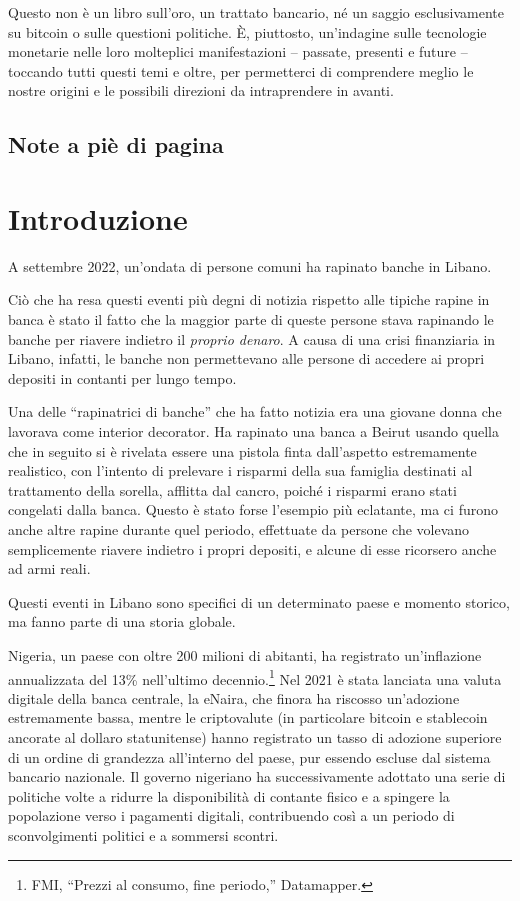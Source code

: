 \documentclass[
  a5paper,
  smalldemyvopaper,10pt,twoside,onecolumn,openright,extrafontsizes,hidelinks]{memoir}
\begin{document}
Questo non è un libro sull'oro, un trattato bancario, né un saggio
esclusivamente su bitcoin o sulle questioni politiche. È, piuttosto,
un'indagine sulle tecnologie monetarie nelle loro molteplici
manifestazioni -- passate, presenti e future -- toccando tutti questi
temi e oltre, per permetterci di comprendere meglio le nostre origini e
le possibili direzioni da intraprendere in avanti.

\section{Note a piè di pagina}\label{note-a-piuxe8-di-pagina}


\chapter{Introduzione}\label{introduzione-1}

A settembre 2022, un'ondata di persone comuni ha rapinato banche in
Libano.

Ciò che ha resa questi eventi più degni di notizia rispetto alle tipiche
rapine in banca è stato il fatto che la maggior parte di queste persone
stava rapinando le banche per riavere indietro il \emph{proprio denaro}.
A causa di una crisi finanziaria in Libano, infatti, le banche non
permettevano alle persone di accedere ai propri depositi in contanti per
lungo tempo.

Una delle ``rapinatrici di banche'' che ha fatto notizia era una giovane
donna che lavorava come interior decorator. Ha rapinato una banca a
Beirut usando quella che in seguito si è rivelata essere una pistola
finta dall'aspetto estremamente realistico, con l'intento di prelevare i
risparmi della sua famiglia destinati al trattamento della sorella,
afflitta dal cancro, poiché i risparmi erano stati congelati dalla
banca. Questo è stato forse l'esempio più eclatante, ma ci furono anche
altre rapine durante quel periodo, effettuate da persone che volevano
semplicemente riavere indietro i propri depositi, e alcune di esse
ricorsero anche ad armi reali.

Questi eventi in Libano sono specifici di un determinato paese e momento
storico, ma fanno parte di una storia globale.

Nigeria, un paese con oltre 200 milioni di abitanti, ha registrato
un'inflazione annualizzata del 13\% nell'ultimo decennio.\footnote{FMI,
  ``Prezzi al consumo, fine periodo,'' Datamapper.} Nel 2021 è stata
lanciata una valuta digitale della banca centrale, la eNaira, che finora
ha riscosso un'adozione estremamente bassa, mentre le criptovalute (in
particolare bitcoin e stablecoin ancorate al dollaro statunitense) hanno
registrato un tasso di adozione superiore di un ordine di grandezza
all'interno del paese, pur essendo escluse dal sistema bancario
nazionale. Il governo nigeriano ha successivamente adottato una serie di
politiche volte a ridurre la disponibilità di contante fisico e a
spingere la popolazione verso i pagamenti digitali, contribuendo così a
un periodo di sconvolgimenti politici e a sommersi scontri.
\end{document}
